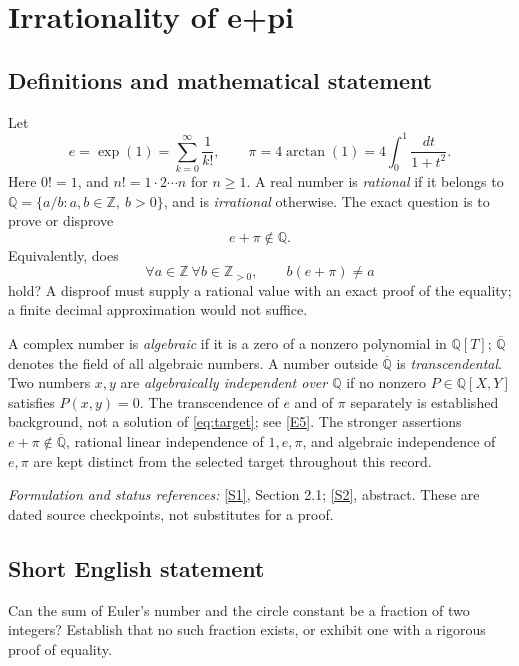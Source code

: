 \documentclass[11pt]{article}
\newcommand{\Q}{\mathbb Q}
\newcommand{\Z}{\mathbb Z}
\newcommand{\Qbar}{\overline{\mathbb Q}}
\begin{document}
\section*{\texorpdfstring{Irrationality of e+pi}{Irrationality of e+pi}}\label{statement}
\label{problem:pi-plus-e}

\subsection{Definitions and mathematical statement}
Let
\[
 e=\exp(1)=\sum_{k=0}^{\infty}\frac1{k!},\qquad
 \pi=4\arctan(1)=4\int_0^1\frac{dt}{1+t^2}.
\]
Here $0!=1$, and $n!=1\cdot2\cdots n$ for $n\ge1$. A real number is
\emph{rational} if it belongs to
$\Q=\{a/b:a,b\in\Z,\ b>0\}$, and is \emph{irrational} otherwise.
The exact question is to prove or disprove
\begin{equation}\label{eq:target}
 \boxed{e+\pi\notin\Q.}
\end{equation}
Equivalently, does
\[
 \forall a\in\Z\ \forall b\in\Z_{>0},\qquad b(e+\pi)\ne a
\]
hold? A disproof must supply a rational value with an exact proof of the
equality; a finite decimal approximation would not suffice.

A complex number is \emph{algebraic} if it is a zero of a nonzero polynomial
in $\Q[T]$; $\Qbar$ denotes the field of all algebraic numbers. A number
outside $\Qbar$ is \emph{transcendental}. Two numbers $x,y$ are
\emph{algebraically independent over $\Q$} if no nonzero
$P\in\Q[X,Y]$ satisfies $P(x,y)=0$.
The transcendence of $e$ and of $\pi$ separately is established background,
not a solution of \eqref{eq:target}; see
\href{https://webusers.imj-prg.fr/~michel.waldschmidt/articles/pdf/ColloquiumDeGiorgiSchanuelConjecture2014.pdf}{[E5]}.
The stronger assertions $e+\pi\notin\Qbar$, rational linear independence
of $1,e,\pi$, and algebraic independence of $e,\pi$ are kept distinct
from the selected target throughout this record.

\par\smallskip\textit{Formulation and status references:}
\href{https://arxiv.org/html/2311.00546v2}{[S1]}, Section 2.1;
\href{https://arxiv.org/abs/2606.17303}{[S2]}, abstract.
These are dated source checkpoints, not substitutes for a proof.

\subsection{Short English statement}
Can the sum of Euler's number and the circle constant be a fraction of two
integers? Establish that no such fraction exists, or exhibit one with a
rigorous proof of equality.
\end{document}
